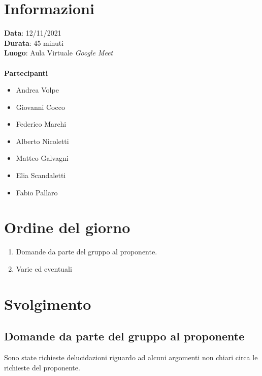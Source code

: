 \documentclass[a4paper, 12pt]{article}
\begin{document}
\makefrontpage

\section{Informazioni}
\textbf{Data}: 12/11/2021\\
\textbf{Durata}: 45 minuti\\
\textbf{Luogo}: Aula Virtuale \textit{Google Meet}\\\\

\textbf{Partecipanti}
\begin{itemize}
	\item Andrea Volpe
	\item Giovanni Cocco
	\item Federico Marchi
	\item Alberto Nicoletti
	\item Matteo Galvagni
	\item Elia Scandaletti
	\item Fabio Pallaro
\end{itemize}

\section{Ordine del giorno}
\begin{enumerate}
	\item Domande da parte del gruppo al proponente.
	\item Varie ed eventuali
\end{enumerate}

\section{Svolgimento}

\subsection{Domande da parte del gruppo al proponente}
Sono state richieste delucidazioni riguardo ad alcuni argomenti non chiari circa le richieste del proponente.
\end{document}

